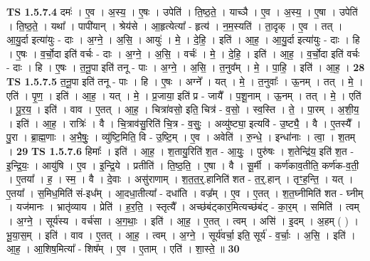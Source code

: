\documentclass[17pt]{extarticle}
\begin{document}
                  \newline
                                \textbf{ TS 1.5.7.4} \newline
                  दमः॑ । ए॒व । अ॒स्य॒ । ए॒षः । उपेति॑ । ति॒ष्ठ॒ते॒ । याच्ञै । ए॒व । अ॒स्य॒ । ए॒षा । उपेति॑ । ति॒ष्ठ॒ते॒ । यथा᳚ । पापी॑यान् । श्रेय॑से । आ॒हृत्येत्या᳚ - हृत्य॑ । न॒म॒स्यति॑ । ता॒दृक् । ए॒व । तत् । आ॒यु॒र्दा इत्या॑युः - दाः । अ॒ग्ने॒ । अ॒सि॒ । आयुः॑ । मे॒ । दे॒हि॒ । इति॑ । आ॒ह॒ । आ॒यु॒र्दा इत्या॑युः - दाः । हि । ए॒षः । व॒र्चो॒दा इति॑ वर्चः - दाः । अ॒ग्ने॒ । अ॒सि॒ । वर्चः॑ । मे॒ । दे॒हि॒ । इति॑ । आ॒ह॒ । व॒र्चो॒दा इति॑ वर्चः - दाः । हि । ए॒षः । त॒नू॒पा इति॑ तनू - पाः । अ॒ग्ने॒ । अ॒सि॒ । त॒नुव᳚म् । मे॒ । पा॒हि॒ । इति॑ । आ॒ह॒ । \textbf{  28} \newline
                  \newline
                                \textbf{ TS 1.5.7.5} \newline
                  त॒नू॒पा इति॑ तनू - पाः । हि । ए॒षः । अग्ने᳚ । यत् । मे॒ । त॒नुवाः᳚ । ऊ॒नम् । तत् । मे॒ । एति॑ । पृ॒ण॒ । इति॑ । आ॒ह॒ । यत् । मे॒ । प्र॒जाया॒ इति॑ प्र - जायै᳚ । प॒शू॒नाम् । ऊ॒नम् । तत् । मे॒ । एति॑ । पू॒र॒य॒ । इति॑ । वाव । ए॒तत् । आ॒ह॒ । चित्रा॑वसो॒ इति॒ चित्र॑ - व॒सो॒ । स्व॒स्ति । ते॒ । पा॒रम् । अ॒शी॒य॒ । इति॑ । आ॒ह॒ । रात्रिः॑ । वै । चि॒त्राव॑सु॒रिति॑ चि॒त्र - व॒सुः॒ । अव्यु॑ष्ट्या॒ इत्यवि॑ - उ॒ष्ट्यै॒ । वै । ए॒तस्यै᳚ । पु॒रा । ब्रा॒ह्म॒णाः । अ॒भै॒षुः॒ । व्यु॑ष्टि॒मिति॒ वि - उ॒ष्टि॒म् । ए॒व । अवेति॑ । रु॒न्धे॒ । इन्धा॑नाः । त्वा॒ । श॒तम् । \textbf{  29} \newline
                  \newline
                                \textbf{ TS 1.5.7.6} \newline
                  हिमाः᳚ । इति॑ । आ॒ह॒ । श॒तायु॒रिति॑ श॒त - आ॒युः॒ । पुरु॑षः । श॒तेन्द्रि॑य॒ इति॑ श॒त - इ॒न्द्रि॒यः॒ । आयु॑षि । ए॒व । इ॒न्द्रि॒ये । प्रतीति॑ । ति॒ष्ठ॒ति॒ । ए॒षा । वै । सू॒र्मी । कर्ण॑काव॒तीति॒ कर्ण॑क-व॒ती॒ । ए॒तया᳚ । ह॒ । स्म॒ । वै । दे॒वाः । असु॑राणाम् । श॒त॒त॒र्॒.हानिति॑ शत - त॒र्॒.हान् । तृꣳ॒॒ह॒न्ति॒ । यत् । ए॒तया᳚ । स॒मिध॒मिति॑ सं-इध᳚म् । आ॒दधा॒तीत्या᳚ - दधा॑ति । वज्र᳚म् । ए॒व । ए॒तत् । श॒त॒घ्नीमिति॑ शत - घ्नीम् । यज॑मानः । भ्रातृ॑व्याय । प्रेति॑ । ह॒र॒ति॒ । स्तृत्यै᳚ । अच्छ॑बंट्कार॒मित्यच्छ॑बंट् - का॒र॒म् । समिति॑ । त्वम् । अ॒ग्ने॒ । सूर्य॑स्य । वर्च॑सा । अ॒ग॒थाः॒ । इति॑ । आ॒ह॒ । ए॒तत् । त्वम् । असि॑ । इ॒दम् । अ॒हम् ( ) । भू॒या॒स॒म् । इति॑ । वाव । ए॒तत् । आ॒ह॒ । त्वम् । अ॒ग्ने॒ । सूर्य॑वर्चा॒ इति॒ सूर्य॑ - व॒र्चाः॒ । अ॒सि॒ । इति॑ । आ॒ह॒ । आ॒शिष॒मित्या᳚ - शिष᳚म् । ए॒व । ए॒ताम् । एति॑ । शा॒स्ते॒ ॥ \textbf{  30 } \newline
\end{document}
